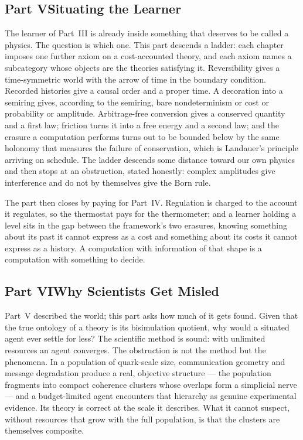 \documentclass[12pt,openright,twoside]{book}
\theoremstyle{remark}
\theoremstyle{plain}
\theoremstyle{remark}
\theoremstyle{plain}
\theoremstyle{plain}
\begin{document}
\subsection*{Part V\quad Situating the Learner}

The learner of Part~III is already inside something that deserves to be
called a physics.
The question is which one.
This part descends a ladder: each chapter imposes one further axiom on a
cost-accounted theory, and each axiom names a subcategory whose objects
are the theories satisfying it.
Reversibility gives a time-symmetric world with the arrow of time in the
boundary condition.
Recorded histories give a causal order and a proper time.
A decoration into a semiring gives, according to the semiring, bare
nondeterminism or cost or probability or amplitude.
Arbitrage-free conversion gives a conserved quantity and a first law;
friction turns it into a free energy and a second law; and the erasure a
computation performs turns out to be bounded below by the same holonomy
that measures the failure of conservation, which is Landauer's principle
arriving on schedule.
The ladder descends some distance toward our own physics and then stops
at an obstruction, stated honestly: complex amplitudes give interference
and do not by themselves give the Born rule.

The part then closes by paying for Part~IV.
Regulation is charged to the account it regulates, so the thermostat pays
for the thermometer; and a learner holding a level sits in the gap
between the framework's two erasures, knowing something about its past it
cannot express as a cost and something about its costs it cannot express
as a history.
A computation with information of that shape is a computation with
something to decide.

\subsection*{Part VI\quad Why Scientists Get Misled}

Part~V described the world; this part asks how much of it gets found.
Given that the true ontology of a theory is its bisimulation quotient,
why would a situated agent ever settle for less?
The scientific method is sound: with unlimited resources an agent
converges.
The obstruction is not the method but the phenomena.
In a population of quark-scale size, communication geometry and message
degradation produce a real, objective structure --- the population
fragments into compact coherence clusters whose overlaps form a
simplicial nerve --- and a budget-limited agent encounters that hierarchy
as genuine experimental evidence.
Its theory is correct at the scale it describes.
What it cannot suspect, without resources that grow with the full
population, is that the clusters are themselves composite.
\end{document}
